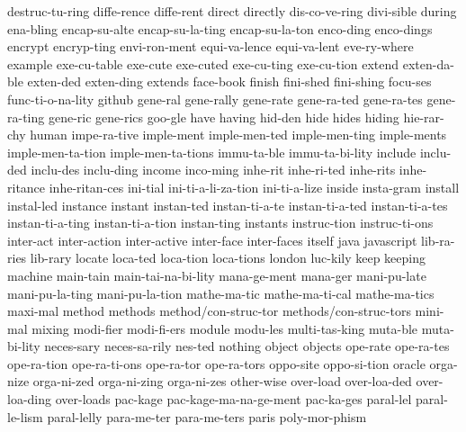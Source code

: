 {    destruc-tu-ring
    diffe-rence
    diffe-rent
    direct
    directly
    dis-co-ve-ring
    divi-sible
    during
    ena-bling
    encap-su-alte
    encap-su-la-ting
    encap-su-la-ton
    enco-ding
    enco-dings
    encrypt
    encryp-ting
    envi-ron-ment
    equi-va-lence
    equi-va-lent
    eve-ry-where
    example
    exe-cu-table
    exe-cute
    exe-cuted
    exe-cu-ting
    exe-cu-tion
    extend
    exten-da-ble
    exten-ded
    exten-ding
    extends
    face-book
    finish
    fini-shed
    fini-shing
    focu-ses
    func-ti-o-na-lity
    github
    gene-ral
    gene-rally
    gene-rate
    gene-ra-ted
    gene-ra-tes
    gene-ra-ting
    gene-ric
    gene-rics
    goo-gle
    have
    having
    hid-den
    hide
    hides
    hiding
    hie-rar-chy
    human
    impe-ra-tive
    imple-ment
    imple-men-ted
    imple-men-ting
    imple-ments
    imple-men-ta-tion
    imple-men-ta-tions
    immu-ta-ble
    immu-ta-bi-lity
    include
    inclu-ded
    inclu-des
    inclu-ding
    income
    inco-ming
    inhe-rit
    inhe-ri-ted
    inhe-rits
    inhe-ritance
    inhe-ritan-ces
    ini-tial
    ini-ti-a-li-za-tion
    ini-ti-a-lize
    inside
    insta-gram
    install
    instal-led
    instance
    instant
    instan-ted
    instan-ti-a-te
    instan-ti-a-ted
    instan-ti-a-tes
    instan-ti-a-ting
    instan-ti-a-tion
    instan-ting
    instants
    instruc-tion
    instruc-ti-ons
    inter-act
    inter-action
    inter-active
    inter-face
    inter-faces
    itself
    java
    javascript
    lib-ra-ries
    lib-rary
    locate
    loca-ted
    loca-tion
    loca-tions
    london
    luc-kily
    keep
    keeping
    machine
    main-tain
    main-tai-na-bi-lity
    mana-ge-ment
    mana-ger
    mani-pu-late
    mani-pu-la-ting
    mani-pu-la-tion
    mathe-ma-tic
    mathe-ma-ti-cal
    mathe-ma-tics
    maxi-mal
    method
    methods
    method/con-struc-tor
    methods/con-struc-tors
    mini-mal
    mixing
    modi-fier
    modi-fi-ers
    module
    modu-les
    multi-tas-king
    muta-ble
    muta-bi-lity
    neces-sary
    neces-sa-rily
    nes-ted
    nothing
    object
    objects
    ope-rate
    ope-ra-tes
    ope-ra-tion
    ope-ra-ti-ons
    ope-ra-tor
    ope-ra-tors
    oppo-site
    oppo-si-tion
    oracle
    orga-nize
    orga-ni-zed
    orga-ni-zing
    orga-ni-zes
    other-wise
    over-load
    over-loa-ded
    over-loa-ding
    over-loads
    pac-kage
    pac-kage-ma-na-ge-ment
    pac-ka-ges
    paral-lel
    paral-le-lism
    paral-lelly
    para-me-ter
    para-me-ters
    paris
    poly-mor-phism
}

